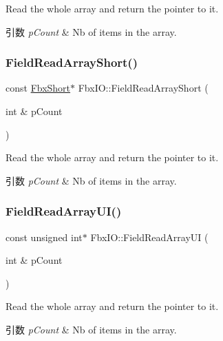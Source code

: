Read the whole array and return the pointer to it. 
\begin{DoxyParams}{引数}
{\em p\+Count} & Nb of items in the array. \\
\hline
\end{DoxyParams}
\mbox{\label{class_fbx_i_o_a24ebad05bd3a4fb6f30c66c36d44c5a1}} 
\subsubsection{\texorpdfstring{Field\+Read\+Array\+Short()}{FieldReadArrayShort()}}
{\footnotesize\ttfamily const \hyperlink{fbxtypes_8h_a56e7a4f56baf132527df7c3cd07017b7}{Fbx\+Short}$\ast$ Fbx\+I\+O\+::\+Field\+Read\+Array\+Short (\begin{DoxyParamCaption}\item[{int \&}]{p\+Count }\end{DoxyParamCaption})}

Read the whole array and return the pointer to it. 
\begin{DoxyParams}{引数}
{\em p\+Count} & Nb of items in the array. \\
\hline
\end{DoxyParams}
\mbox{\label{class_fbx_i_o_ab6ea514d2f3de0ad07810f6e1e980570}} 
\subsubsection{\texorpdfstring{Field\+Read\+Array\+U\+I()}{FieldReadArrayUI()}}
{\footnotesize\ttfamily const unsigned int$\ast$ Fbx\+I\+O\+::\+Field\+Read\+Array\+UI (\begin{DoxyParamCaption}\item[{int \&}]{p\+Count }\end{DoxyParamCaption})}

Read the whole array and return the pointer to it. 
\begin{DoxyParams}{引数}
{\em p\+Count} & Nb of items in the array. \\
\hline
\end{DoxyParams}
\mbox{\label{class_fbx_i_o_a45c8b973c49088a32c277dfa25fb2b92}} 
